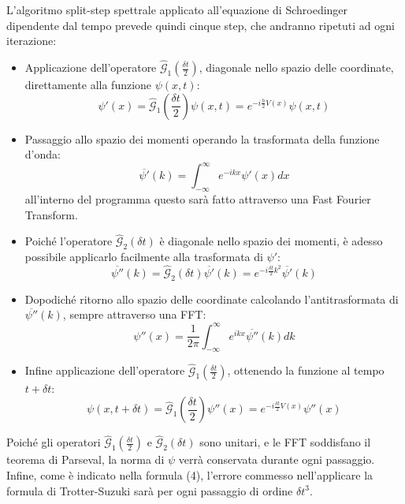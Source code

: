 \documentclass[12pt,onecolumn,a4paper]{memoir}
\begin{document}
L'algoritmo split-step spettrale applicato all'equazione di Schroedinger dipendente dal tempo prevede quindi cinque step, che andranno ripetuti ad ogni iterazione:
\begin{itemize}
\item Applicazione dell'operatore $\hat{\mathcal{G}}_1(\frac{\delta t}{2})$, diagonale nello spazio delle coordinate, direttamente alla funzione $\psi(x,t)$: 
\begin{equation}
\psi'(x) = \hat{\mathcal{G}}_1(\frac{\delta t}{2})\psi(x,t) = e^{-i\frac{h}{2}V(x)}\psi(x,t)
\end{equation}
\item Passaggio allo spazio dei momenti operando la trasformata della funzione d'onda:
\begin{equation}
\overline{\psi'}(k) = \int_{-\infty}^{\infty} e^{-ikx}\psi'(x)dx
\end{equation}
all'interno del programma questo sarà fatto attraverso una Fast Fourier Transform.
\item Poiché l'operatore $\hat{\mathcal{G}}_2(\delta t)$ è diagonale nello spazio dei momenti, è adesso possibile applicarlo facilmente alla trasformata di $\psi'$:
\begin{equation}
\overline{\psi''}(k) = \hat{\mathcal{G}}_2(\delta t) \overline{\psi'}(k) = e^{-i\frac{\delta t}{2}k^2} \overline{\psi'}(k)
\end{equation}
\item Dopodiché ritorno allo spazio delle coordinate calcolando l'antitrasformata di $\overline{\psi''}(k)$, sempre attraverso una FFT:
\begin{equation}
\psi''(x) = \dfrac{1}{2\pi}\int_{-\infty}^{\infty} e^{ikx}\overline{\psi''}(k)dk
\end{equation}
\item Infine applicazione dell'operatore $\hat{\mathcal{G}}_1(\frac{\delta t}{2})$, ottenendo la funzione al tempo $t+\delta t$:
\begin{equation}
\psi(x,t+\delta t) = \hat{\mathcal{G}}_1(\frac{\delta t}{2})\psi''(x) = e^{-i\frac{\delta t}{2}V(x)}\psi''(x)
\end{equation}
\end{itemize}

Poiché gli operatori $\hat{\mathcal{G}}_1(\frac{\delta t}{2})$ e $\hat{\mathcal{G}}_2(\delta t)$ sono unitari, e le FFT soddisfano il teorema di Parseval, la norma di $\psi$ verrà conservata durante ogni passaggio. Infine, come è indicato nella formula (4), l'errore commesso nell'applicare la formula di Trotter-Suzuki sarà per ogni passaggio di ordine  $\delta t^3$.\newline
\end{document}
